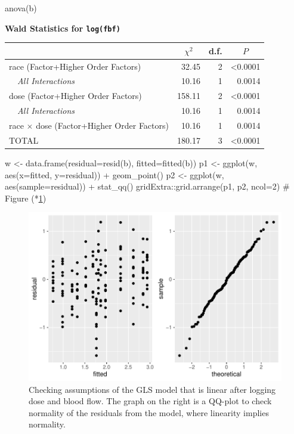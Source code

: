 \begin{Sinput}
anova(b)
\end{Sinput}
\textbf{\Needspace{2in}
Wald Statistics for \texttt{\smaller log(fbf)}}\begin{center}
\begin{tabular}{lrrr}
\hline\hline
\multicolumn{1}{l}{}&\multicolumn{1}{c}{$\chi^{2}$}&\multicolumn{1}{c}{d.f.}&\multicolumn{1}{c}{$P$}\tabularnewline
\hline
race  (Factor+Higher Order Factors)& 32.45&2&\textless 0.0001\tabularnewline
~~\emph{All Interactions}& 10.16&1&0.0014\tabularnewline
dose  (Factor+Higher Order Factors)&158.11&2&\textless 0.0001\tabularnewline
~~\emph{All Interactions}& 10.16&1&0.0014\tabularnewline
race $\times$ dose  (Factor+Higher Order Factors)& 10.16&1&0.0014\tabularnewline
TOTAL&180.17&3&\textless 0.0001\tabularnewline
\hline
\end{tabular}\end{center}
\begin{Sinput}
w <- data.frame(residual=resid(b), fitted=fitted(b))
p1 <- ggplot(w, aes(x=fitted, y=residual)) + geom_point()
p2 <- ggplot(w, aes(sample=residual)) + stat_qq()
gridExtra::grid.arrange(p1, p2, ncol=2)   # Figure (*\ref{fig:serial-glsc}\ipacue*)
\end{Sinput}
\begin{figure}[htbp]

\centerline{\includegraphics[width=\maxwidth]{serial-glsc-1} }

\caption[Checking assumptions of GLS model]{Checking assumptions of the GLS model that is linear after logging dose and blood flow.  The graph on the right is a QQ-plot to check normality of the residuals from the model, where linearity implies normality.}\label{fig:serial-glsc}
\end{figure}


